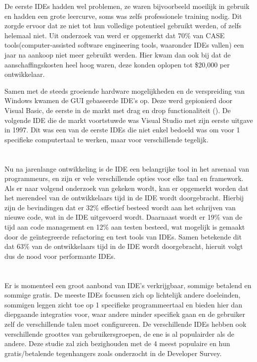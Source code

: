 De eerste IDEs hadden wel problemen, ze waren bijvoorbeeld moeilijk in gebruik en hadden een grote leercurve, soms was zelfs professionele training nodig. Dit zorgde ervoor dat ze niet tot hun volledige potentieel gebruikt werden, of zelfs helemaal niet. Uit onderzoek van \textcite{Kline2005} werd er opgemerkt dat 70\% van CASE tools(computer-assisted software engineering tools, waaronder IDEs vallen) een jaar na aankoop niet meer gebruikt werden. Hier kwam dan ook bij dat de aanschaffingskosten heel hoog waren, deze konden oplopen tot \$20,000 per ontwikkelaar.

Samen met de steeds groeiende hardware mogelijkheden en de verspreiding van Windows kwamen de GUI gebaseerde IDE’s op. Deze werd gepionierd door Visual Basic, de eerste in de markt met drag en drop functionaliteit (\textcite{Kiong2019}). De volgende IDE die de markt voortstuwde was Visual Studio met zijn eerste uitgave in 1997. Dit was een van de eerste IDEs die niet enkel bedoeld was om voor 1 specifieke computertaal te werken, maar voor verschillende tegelijk.

\section{}
\label{sec:IDE-nood}

Nu na jarenlange ontwikkeling is de IDE een belangrijke tool in het arsenaal van programmeurs, en zijn er vele verschillende opties voor elke taal en framework. Als er naar volgend onderzoek van \textcite{Tidelift2019} gekeken wordt, kan er opgemerkt worden dat het merendeel van de ontwikkelaars tijd in de IDE wordt doorgebracht. Hierbij zijn de bevindingen dat er 32\% effectief besteed wordt aan het schrijven van nieuwe code, wat in de IDE uitgevoerd wordt. Daarnaast wordt er 19\% van de tijd aan code management en 12\% aan testen besteed, wat mogelijk is gemaakt door de geïntegreerde refactoring en test tools van IDEs. Samen betekende dit dat 63\% van de ontwikkelaars tijd in de IDE wordt doorgebracht, hieruit volgt dus de nood voor performante IDEs.

\section{}
\label{sec:IDE-prominent}

Er is momenteel een groot aanbond van IDE’s verkrijgbaar, sommige betalend en sommige gratis. De meeste IDEs focussen zich op lichtelijk andere doeleinden, sommigen leggen zicht toe op 1 specifieke programmeertaal en bieden hier dan diepgaande integraties voor, waar andere minder specifiek gaan en de gebruiker zelf de verschillende talen moet configureren. De verschillende IDEs hebben ook verschillende groottes van gebruikersgroepen, de ene is al populairder als de andere. Deze studie zal zich bezighouden met de 4 meest populaire en hun gratis/betalende tegenhangers zoals onderzocht in de \textcite{StackOverflow2021} Developer Survey.

